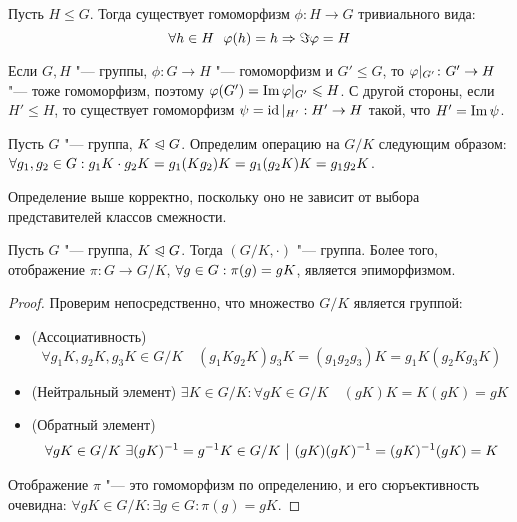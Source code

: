 \begin{note}
	Пусть $H \le G$. Тогда существует гомоморфизм $\phi \colon H \to G$ тривиального вида:
	\[
		\forall h \in H\ \ \phi(h) = h \ra \Im \phi = H
	\]
\end{note}

\begin{note}
	Если $G, H$ "--- группы, $\phi: G \to H$ "--- гомоморфизм и $G' \le G$, то $\phi|_{G'} \colon G' \hm\to H$ "--- тоже гомоморфизм, поэтому $\phi(G') \hm= \im\phi|_{G'} \le H$. С другой стороны, если $H' \le H$, то существует гомоморфизм $\psi = \operatorname{id}|_{H'}: H' \to H$ такой, что $H' = \operatorname{Im}\psi$.
\end{note}

\begin{definition}
	Пусть $G$ "--- группа, $K \trianglelefteqslant G$. Определим операцию на $G / K$ следующим образом: $\forall g_1, g_2 \in G: g_1K\cdot g_2K \hm= g_1(Kg_2)K = g_1(g_2K)K = g_1g_2K$.
\end{definition}

\begin{note}
	Определение выше корректно, поскольку оно не зависит от выбора представителей классов смежности.
\end{note}

\begin{proposition}
	Пусть $G$ "--- группа, $K \trianglelefteqslant G$. Тогда $(G / K, \cdot)$ "--- группа. Более того, отображение $\pi: G \to G / K$, $\forall g \in G: \pi(g) \hm= gK$, является эпиморфизмом.
\end{proposition}

\begin{proof}
	Проверим непосредственно, что множество $G / K$ является группой:
	\begin{itemize}
		\item (Ассоциативность) \[
			\forall g_1K, g_2K, g_3K \in G / K \quad (g_1Kg_2K)g_3K = (g_1g_2g_3)K = g_1K(g_2Kg_3K)
		\]
		\item (Нейтральный элемент) \(
			\exists K \in G / K: \forall gK \in G / K \quad (gK)K = K(gK) = gK
		\)
		\item (Обратный элемент) \[
			\forall gK \in G / K\ \exists (gK)^{-1} = g^{-1}K \in G / K \such (gK)(gK)^{-1} \hm= (gK)^{-1}(gK) = K
		\]
	\end{itemize}
	
	Отображение $\pi$ "--- это гомоморфизм по определению, и его сюръективность очевидна: $\forall gK \in G / K: \exists g \in G: \pi(g) = gK$.
\end{proof}

